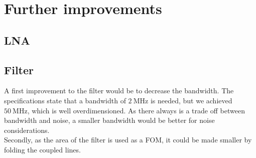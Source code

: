 \documentclass[a4paper]{article}        %
\begin{document}
\section{Further improvements}

	\subsection{LNA}

	\subsection{Filter}
		A first improvement to the filter would be to decrease the bandwidth. The specifications state that a bandwidth of $\SI{2}{\mega\hertz}$ is needed, but we achieved $\SI{50}{\mega\hertz}$, which is well overdimensioned. As there always is a trade off between bandwidth and noise, a smaller bandwidth would be better for noise considerations. \\

		Secondly, as the area of the filter is used as a FOM, it could be made smaller by folding the coupled lines. 



\end{document}
